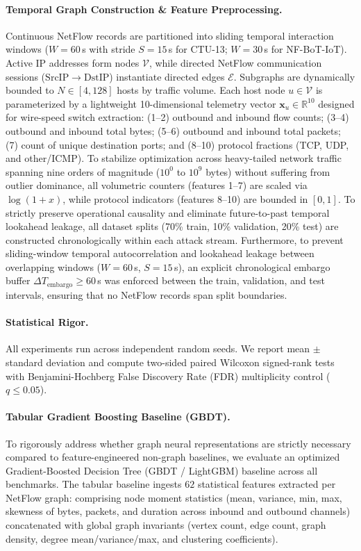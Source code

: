 \documentclass[10pt,twocolumn,letterpaper]{article}
\begin{document}
\paragraph{Temporal Graph Construction \& Feature Preprocessing.}
Continuous NetFlow records are partitioned into sliding temporal interaction windows ($W = 60$\,s with stride $S = 15$\,s for CTU-13; $W = 30$\,s for NF-BoT-IoT). Active IP addresses form nodes $\mathcal{V}$, while directed NetFlow communication sessions ($\mathrm{SrcIP} \to \mathrm{DstIP}$) instantiate directed edges $\mathcal{E}$. Subgraphs are dynamically bounded to $N \in [4, 128]$ hosts by traffic volume. Each host node $u \in \mathcal{V}$ is parameterized by a lightweight 10-dimensional telemetry vector $\mathbf{x}_u \in \mathbb{R}^{10}$ designed for wire-speed switch extraction: (1--2) outbound and inbound flow counts; (3--4) outbound and inbound total bytes; (5--6) outbound and inbound total packets; (7) count of unique destination ports; and (8--10) protocol fractions (TCP, UDP, and other/ICMP). To stabilize optimization across heavy-tailed network traffic spanning nine orders of magnitude ($10^0$ to $10^9$ bytes) without suffering from outlier dominance, all volumetric counters (features 1--7) are scaled via $\log(1 + x)$, while protocol indicators (features 8--10) are bounded in $[0, 1]$. To strictly preserve operational causality and eliminate future-to-past temporal lookahead leakage, all dataset splits (70\% train, 10\% validation, 20\% test) are constructed chronologically within each attack stream. Furthermore, to prevent sliding-window temporal autocorrelation and lookahead leakage between overlapping windows ($W=60$\,s, $S=15$\,s), an explicit chronological embargo buffer $\Delta T_{\text{embargo}} \ge 60$\,s was enforced between the train, validation, and test intervals, ensuring that no NetFlow records span split boundaries.

\paragraph{Statistical Rigor.}
All experiments run across independent random seeds. We report mean $\pm$ standard deviation and compute two-sided paired Wilcoxon signed-rank tests with Benjamini-Hochberg False Discovery Rate (FDR) multiplicity control ($q \le 0.05$).

\paragraph{Tabular Gradient Boosting Baseline (GBDT).}
To rigorously address whether graph neural representations are strictly necessary compared to feature-engineered non-graph baselines, we evaluate an optimized Gradient-Boosted Decision Tree (GBDT / LightGBM) baseline across all benchmarks. The tabular baseline ingests $62$ statistical features extracted per NetFlow graph: comprising node moment statistics (mean, variance, min, max, skewness of bytes, packets, and duration across inbound and outbound channels) concatenated with global graph invariants (vertex count, edge count, graph density, degree mean/variance/max, and clustering coefficients).
\end{document}
